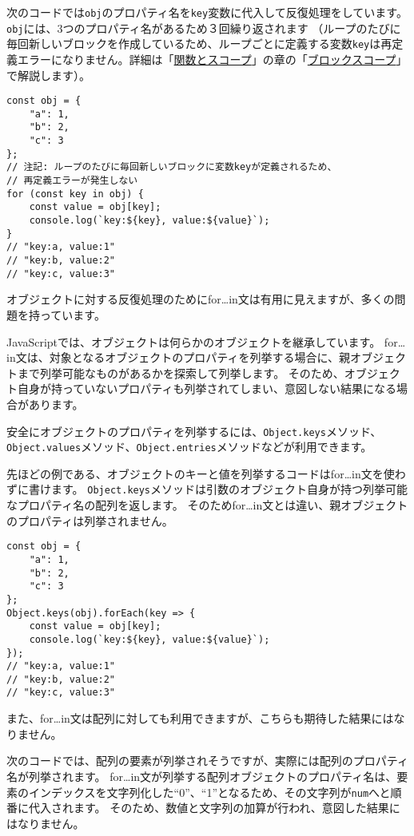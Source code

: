 次のコードでは\texttt{obj}のプロパティ名を\texttt{key}変数に代入して反復処理をしています。
\texttt{obj}には、3つのプロパティ名があるため３回繰り返されます
（ループのたびに毎回新しいブロックを作成しているため、ループごとに定義する変数\texttt{key}は再定義エラーになりません。詳細は「\hyperlink{function-and-scope}{関数とスコープ}」の章の「\hyperlink{block-scope}{ブロックスコープ}」で解説します）。

\begin{lstlisting}
const obj = {
    "a": 1,
    "b": 2,
    "c": 3
};
// 注記: ループのたびに毎回新しいブロックに変数keyが定義されるため、
// 再定義エラーが発生しない
for (const key in obj) {
    const value = obj[key];
    console.log(`key:${key}, value:${value}`);
}
// "key:a, value:1"
// "key:b, value:2"
// "key:c, value:3"
\end{lstlisting}

オブジェクトに対する反復処理のためにfor\ldots{}in文は有用に見えますが、多くの問題を持っています。

JavaScriptでは、オブジェクトは何らかのオブジェクトを継承しています。
for\ldots{}in文は、対象となるオブジェクトのプロパティを列挙する場合に、親オブジェクトまで列挙可能なものがあるかを探索して列挙します。
そのため、オブジェクト自身が持っていないプロパティも列挙されてしまい、意図しない結果になる場合があります。

安全にオブジェクトのプロパティを列挙するには、\texttt{Object.keys}メソッド、\texttt{Object.values}メソッド、\texttt{Object.entries}メソッドなどが利用できます。

先ほどの例である、オブジェクトのキーと値を列挙するコードはfor\ldots{}in文を使わずに書けます。
\texttt{Object.keys}メソッドは引数のオブジェクト自身が持つ列挙可能なプロパティ名の配列を返します。
そのためfor\ldots{}in文とは違い、親オブジェクトのプロパティは列挙されません。

\begin{lstlisting}
const obj = {
    "a": 1,
    "b": 2,
    "c": 3
};
Object.keys(obj).forEach(key => {
    const value = obj[key];
    console.log(`key:${key}, value:${value}`);
});
// "key:a, value:1"
// "key:b, value:2"
// "key:c, value:3"
\end{lstlisting}

また、for\ldots{}in文は配列に対しても利用できますが、こちらも期待した結果にはなりません。

次のコードでは、配列の要素が列挙されそうですが、実際には配列のプロパティ名が列挙されます。
for\ldots{}in文が列挙する配列オブジェクトのプロパティ名は、要素のインデックスを文字列化した``0''、``1''となるため、その文字列が\texttt{num}へと順番に代入されます。
そのため、数値と文字列の加算が行われ、意図した結果にはなりません。

